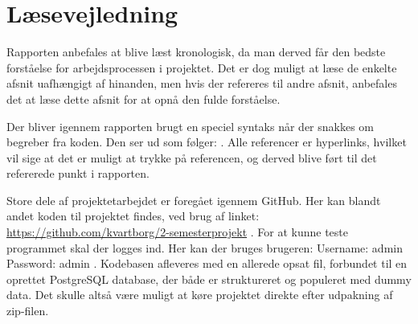 \documentclass[../main.tex]{subfiles}
\begin{document}
\section*{Læsevejledning}

Rapporten anbefales at blive læst kronologisk, da man derved får den bedste forståelse for arbejdsprocessen i projektet. Det er dog muligt at læse de enkelte afsnit uafhængigt af hinanden, men hvis der refereres til andre afsnit, anbefales det at læse dette afsnit for at opnå den fulde forståelse. 

Der bliver igennem rapporten brugt en speciel syntaks når der snakkes om begreber fra koden. Den ser ud som følger: . Alle referencer er hyperlinks, hvilket vil sige at det er muligt at trykke på referencen, og derved blive ført til det refererede punkt i rapporten.  

Store dele af projektetarbejdet er foregået igennem GitHub. Her kan blandt andet koden til projektet findes, ved brug af linket: \url{https://github.com/kvartborg/2-semesterprojekt} . For at kunne teste programmet skal der logges ind. Her kan der bruges brugeren: Username: admin Password: admin .
Kodebasen afleveres med en allerede opsat  fil, forbundet til en oprettet PostgreSQL database, der både er struktureret og populeret med dummy data. Det skulle altså være muligt at køre projektet direkte efter udpakning af zip-filen.

\newpage
\end{document}
